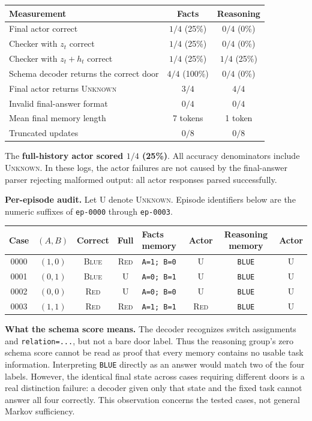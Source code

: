 \documentclass[11pt,letterpaper]{article}
\newcommand{\code}[1]{\texttt{#1}}
\newcommand{\unk}{\textsc{Unknown}}
\newcommand{\red}{\textsc{Red}}
\newcommand{\blue}{\textsc{Blue}}
\begin{document}
\begin{center}
\small
\begin{tabularx}{\linewidth}{@{}Lcc@{}}
\toprule
Measurement & Facts & Reasoning\\
\midrule
Final actor correct & $1/4$ (25\%) & $0/4$ (0\%)\\
Checker with $z_t$ correct & $1/4$ (25\%) & $0/4$ (0\%)\\
Checker with $z_t+h_t$ correct & $1/4$ (25\%) & $1/4$ (25\%)\\
Schema decoder returns the correct door & $4/4$ (100\%) & $0/4$ (0\%)\\
Final actor returns \unk & $3/4$ & $4/4$\\
Invalid final-answer format & $0/4$ & $0/4$\\
Mean final memory length & 7 tokens & 1 token\\
Truncated updates & $0/8$ & $0/8$\\
\bottomrule
\end{tabularx}
\end{center}
The \textbf{full-history actor scored $1/4$ (25\%)}. All accuracy denominators include
\unk. In these logs, the actor failures are not caused by the final-answer parser
rejecting malformed output: all actor responses parsed successfully.

\textbf{Per-episode audit.} Let U denote \unk. Episode identifiers below are the
numeric suffixes of \code{ep-0000} through \code{ep-0003}.

\begin{center}
\small
\setlength{\tabcolsep}{4pt}
\begin{tabular}{@{}cccc l c c c@{}}
\toprule
Case & $(A,B)$ & Correct & Full & Facts memory & Actor & Reasoning memory & Actor\\
\midrule
0000 & $(1,0)$ & \blue & \red & \code{A=1; B=0} & U & \code{BLUE} & U\\
0001 & $(0,1)$ & \blue & U & \code{A=0; B=1} & U & \code{BLUE} & U\\
0002 & $(0,0)$ & \red & U & \code{A=0; B=0} & U & \code{BLUE} & U\\
0003 & $(1,1)$ & \red & \red & \code{A=1; B=1} & \red & \code{BLUE} & U\\
\bottomrule
\end{tabular}
\end{center}

\textbf{What the schema score means.} The decoder recognizes switch assignments and
\code{relation=...}, but not a bare door label. Thus the reasoning group's zero schema
score cannot be read as proof that every memory contains no usable task information.
Interpreting \code{BLUE} directly as an answer would match two of the four labels.
However, the identical final state across cases requiring different doors is a real
distinction failure: a decoder given only that state and the fixed task cannot
answer all four correctly. This observation concerns the tested cases, not general
Markov sufficiency.
\end{document}
